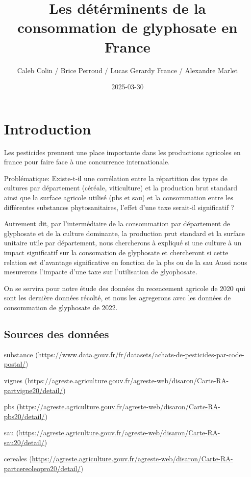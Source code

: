 \documentclass[
]{article}
\title{Les détérminents de la consommation de glyphosate en France}
\author{Caleb Colin / Brice Perroud / Lucas Gerardy France / Alexandre
Marlet}
\date{2025-03-30}
\begin{document}
\maketitle

\section{Introduction}\label{introduction}

Les pesticides prennent une place importante dans les productions
agricoles en france pour faire face à une concurrence internationale.

Problématique: Existe-t-il une corrélation entre la répartition des
types de cultures par département (céréale, viticulture) et la
production brut standard ainsi que la surface agricole utilisé (pbs et
sau) et la consommation entre les différentes substances
phytosanitaires, l'effet d'une taxe serait-il significatif ?

Autrement dit, par l'intermédiaire de la consommation par département de
glyphosate et de la culture dominante, la production prut standard et la
surface unitaire utile par département, nous chercherons à expliqué si
une culture à un impact significatif sur la consomation de glyphosate et
chercheront si cette relation est d'avantage significative en fonction
de la pbs ou de la sau Aussi nous mesurerons l'impacte d'une taxe sur
l'utilisation de glyophosate.

On se servira pour notre étude des données du recencement agricole de
2020 qui sont les dernière données récolté, et nous les agregerons avec
les données de consommation de glyphosate de 2022.

\subsection{Sources des données}\label{sources-des-donnuxe9es}

substance
(\url{https://www.data.gouv.fr/fr/datasets/achats-de-pesticides-par-code-postal/})

vignes
(\url{https://agreste.agriculture.gouv.fr/agreste-web/disaron/Carte-RA-partvigne20/detail/})

pbs
(\url{https://agreste.agriculture.gouv.fr/agreste-web/disaron/Carte-RA-pbs20/detail/})

sau
(\url{https://agreste.agriculture.gouv.fr/agreste-web/disaron/Carte-RA-sau20/detail/})

cereales
(\url{https://agreste.agriculture.gouv.fr/agreste-web/disaron/Carte-RA-partcereoleopro20/detail/})
\end{document}
